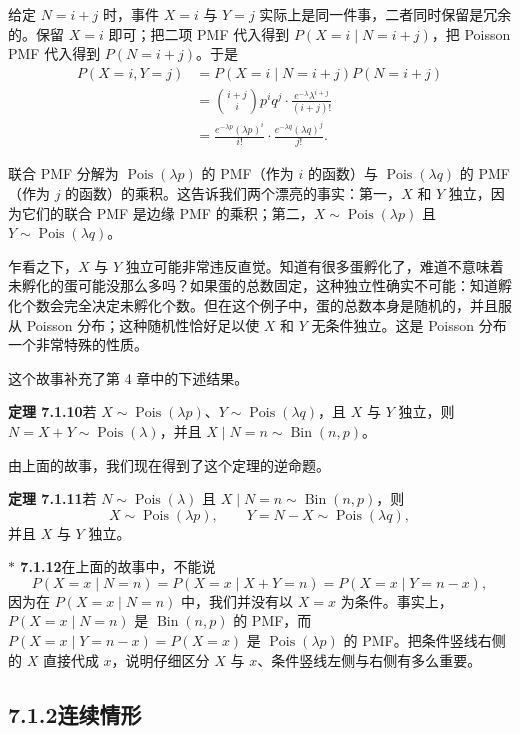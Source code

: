 \documentclass[UTF8, 12pt, fontset=fandol, oneside]{ctexart}
\newcommand{\biohazard}{\ensuremath{\ast}}
\begin{document}
给定 $N=i+j$ 时，事件 $X=i$ 与 $Y=j$ 实际上是同一件事，二者同时保留是冗余的。保留 $X=i$ 即可；把二项 PMF 代入得到 $P(X=i\mid N=i+j)$，把 Poisson PMF 代入得到 $P(N=i+j)$。于是
\[
\begin{aligned}
  P(X=i,Y=j)
  &=P(X=i\mid N=i+j)P(N=i+j)\\
  &=\binom{i+j}{i}p^i q^j\cdot \frac{e^{-\lambda}\lambda^{i+j}}{(i+j)!}\\
  &=\frac{e^{-\lambda p}(\lambda p)^i}{i!}\cdot
    \frac{e^{-\lambda q}(\lambda q)^j}{j!}.
\end{aligned}
\]

联合 PMF 分解为 $\operatorname{Pois}(\lambda p)$ 的 PMF（作为 $i$ 的函数）与 $\operatorname{Pois}(\lambda q)$ 的 PMF（作为 $j$ 的函数）的乘积。这告诉我们两个漂亮的事实：第一，$X$ 和 $Y$ 独立，因为它们的联合 PMF 是边缘 PMF 的乘积；第二，$X\sim \operatorname{Pois}(\lambda p)$ 且 $Y\sim \operatorname{Pois}(\lambda q)$。

乍看之下，$X$ 与 $Y$ 独立可能非常违反直觉。知道有很多蛋孵化了，难道不意味着未孵化的蛋可能没那么多吗？如果蛋的总数固定，这种独立性确实不可能：知道孵化个数会完全决定未孵化个数。但在这个例子中，蛋的总数本身是随机的，并且服从 Poisson 分布；这种随机性恰好足以使 $X$ 和 $Y$ 无条件独立。这是 Poisson 分布一个非常特殊的性质。

这个故事补充了第 4 章中的下述结果。

\noindent\textbf{定理 7.1.10}\quad 若 $X\sim \operatorname{Pois}(\lambda p)$、$Y\sim \operatorname{Pois}(\lambda q)$，且 $X$ 与 $Y$ 独立，则 $N=X+Y\sim \operatorname{Pois}(\lambda)$，并且 $X\mid N=n\sim \operatorname{Bin}(n,p)$。

由上面的故事，我们现在得到了这个定理的逆命题。

\noindent\textbf{定理 7.1.11}\quad 若 $N\sim \operatorname{Pois}(\lambda)$ 且 $X\mid N=n\sim \operatorname{Bin}(n,p)$，则
\[
  X\sim \operatorname{Pois}(\lambda p),\qquad
  Y=N-X\sim \operatorname{Pois}(\lambda q),
\]
并且 $X$ 与 $Y$ 独立。

\noindent\textbf{$\biohazard$ 7.1.12}\quad 在上面的故事中，不能说
\[
  P(X=x\mid N=n)=P(X=x\mid X+Y=n)=P(X=x\mid Y=n-x),
\]
因为在 $P(X=x\mid N=n)$ 中，我们并没有以 $X=x$ 为条件。事实上，$P(X=x\mid N=n)$ 是 $\operatorname{Bin}(n,p)$ 的 PMF，而 $P(X=x\mid Y=n-x)=P(X=x)$ 是 $\operatorname{Pois}(\lambda p)$ 的 PMF。把条件竖线右侧的 $X$ 直接代成 $x$，说明仔细区分 $X$ 与 $x$、条件竖线左侧与右侧有多么重要。

\subsection*{7.1.2\quad 连续情形}
\end{document}
